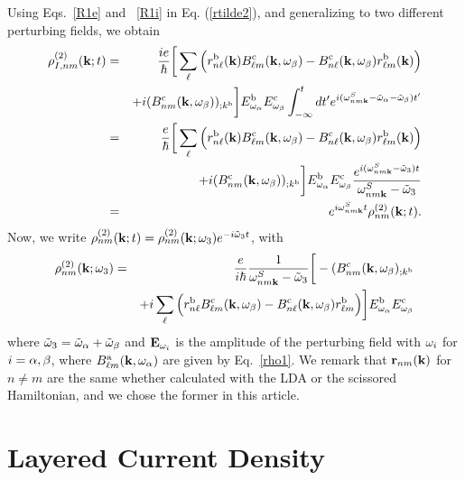 \documentclass[floatfix,prb,aps,superscriptaddress,11pt,preprint]{revtex4}
\begin{document}
Using Eqs.~\eqref{R1e} and ~\eqref{R1i} in Eq. (\ref{rtilde2}),
and generalizing to two different perturbing fields,
we obtain
\begin{eqnarray}\label{rtilde33}
{\rho}^{(2)}_{I,nm}(\mathbf{k};t)
&=&
\frac{ie}{\hbar}
\bigg[
\sum_{\ell}
\Big(
r^{\mathrm{b}}_{n\ell}(\mathbf{k})
B^{\mathrm{c}}_{\ell m}(\mathbf{k},\omega_\beta)
-
B^{\mathrm{c}}_{n\ell}(\mathbf{k},\omega_\beta)
r^{\mathrm{b}}_{\ell m}(\mathbf{k})
\Big)
\nonumber \\
&&+
i
(B^{\mathrm{c}}_{nm}(\mathbf{k},\omega_\beta))_{;k^{\mathrm{b}}}
\bigg]
E^{\mathrm{b}}_{\omega_\alpha}E_{\omega_\beta}^{\mathrm{c}}
\int_{-\infty}^t dt'
e^{i(\omega^S_{nm\mathbf{k}}-\tilde\omega_\alpha-\tilde\omega_\beta)t'}
\nonumber \\
&=&
\frac{e}{\hbar}
\bigg[
\sum_{\ell}
\Big(
r^{\mathrm{b}}_{n\ell}(\mathbf{k})
B^{\mathrm{c}}_{\ell m}(\mathbf{k},\omega_\beta)
-
B^{\mathrm{c}}_{n\ell}(\mathbf{k},\omega_\beta)
r^{\mathrm{b}}_{\ell m}(\mathbf{k})
\Big)
\nonumber \\
&&+
i
(B^{\mathrm{c}}_{nm}(\mathbf{k},\omega_\beta))_{;k^{\mathrm{b}}}
\bigg]
E^{\mathrm{b}}_{\omega_\alpha}E_{\omega_\beta}^{\mathrm{c}}
\frac{e^{i(\omega^S_{nm\mathbf{k}}-\tilde\omega_3)t}}
{\omega^S_{nm\mathbf{k}}-\tilde\omega_3}
\nonumber \\
&=&
e^{i\omega^S_{nm\mathbf{k}}t}
\rho_{nm}^{(2)}(\mathbf{k};t)
.
\end{eqnarray}
Now, we write
$\rho_{nm}^{(2)}(\mathbf{k};t)=\rho_{nm}^{(2)}(\mathbf{k};\omega_3)e^{-i\tilde\omega_3 t}$,
with
\begin{eqnarray}\label{rho2}
{\rho}_{nm}^{(2)}(\mathbf{k};\omega_3)&=&\frac{e}{i\hbar}\frac{1}{\omega^S_{nm\mathbf{k}}-\tilde\omega_3}
\bigg[-(B_{nm}^{\mathrm{c}}(\mathbf{k},\omega_\beta)_{;k^{\mathrm{b}}}
\nonumber \\
&&
+i\sum_\ell\Big(r_{n\ell}^{\mathrm{b}}B_{\ell m}^{\mathrm{c}}(\mathbf{k},\omega_\beta) - B_{n\ell}^{\mathrm{c}}(\mathbf{k},\omega_\beta)
  r_{\ell m}^{\mathrm{b}}\Big)
\bigg] 
E^{\mathrm{b}}_{\omega_\alpha}E_{\omega_\beta}^{\mathrm{c}}
\end{eqnarray} 
where $\tilde\omega_3=\tilde\omega_\alpha+\tilde\omega_\beta$ and $\mathbf{E}_{\omega_i}$ is the amplitude of the perturbing
field with $\omega_i$ for $i=\alpha,\beta$, where $B_{\ell
  m}^{\mathrm{a}}(\mathbf{k},\omega_\alpha)$ are given by 
Eq.~\eqref{rho1}. We remark that $\mathbf{r}_{nm}(\mathbf{k})$ for $n\ne m$ are
the same whether calculated with the LDA or the scissored Hamiltonian,
and we chose the former in this article.

\section{Layered Current Density}\label{cd}
\end{document}
